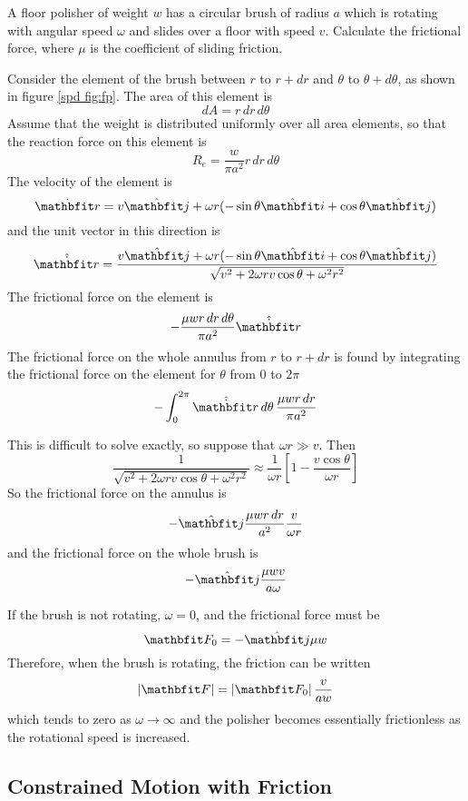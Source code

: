 \begin{example}
\problem
A floor polisher of weight $w$ has a circular brush of radius $a$ which is
rotating with angular speed $\omega$ and slides over a floor with speed $v$. 
Calculate the frictional force, where $\mu$ is the coefficient of sliding
friction.  

\solution
Consider the element of the brush between $r$ to $r+dr$ and $\theta$ to
$\theta+d\theta$, as shown in figure \ref{spd fig:fp}.  The area of this 
element is 
$$dA=r\,dr\,d\theta$$
Assume that the weight is distributed uniformly over all area elements, so
that the reaction force on this element is
$$R_e=\frac{w}{\pi a^2}r\,dr\,d\theta$$
The velocity of the element is
$$\dot{\vect{r}}=v\jvect+\omega r (-\sin\theta\ivect+\cos\theta\jvect)$$
and the unit vector in this direction is
$$\hat{\dot{\vect{r}}}=\frac{v\jvect+\omega r 
(-\sin\theta\ivect+\cos\theta\jvect)}
{\sqrt{v^2+2\omega rv\cos\theta+\omega^2r^2}}$$
The frictional force on the element is
$$-\frac{\mu w r\,dr\,d\theta}{\pi a^2}\hat{\dot{\vect{r}}}$$
The frictional force on the whole annulus from $r$ to $r+dr$ is found by
integrating the frictional force on the element for $\theta$ from $0$ to
$2\pi$
$$-\int_0^{2\pi}\hat{\dot{\vect{r}}}\,d\theta\,\frac{\mu wr\,dr}{\pi a^2}$$

This is difficult to solve exactly, so suppose that $\omega r\gg v$.  Then
$$\frac{1}{\sqrt{v^2+2\omega rv\cos\theta+\omega^2r^2}}\approx
\frac{1}{\omega r}\left[1-\frac{v\cos\theta}{\omega r}\right]$$
So the frictional force on the annulus is
$$-\jvect\frac{\mu wr\,dr}{a^2}\frac{v}{\omega r}$$
and the frictional force on the whole brush is
$$-\jvect\frac{\mu wv}{a\omega}$$

If the brush is not rotating, $\omega=0$, and the frictional force must be
$$\vect{F}_0=-\jvect\mu w$$
Therefore, when the brush is rotating, the friction can be written
$$\left|\vect{F}\right|=\left|\vect{F}_0\right|\frac{v}{aw}$$
which tends to zero as $\omega\to\infty$ and the polisher becomes
essentially frictionless as the rotational speed is increased.
\end{example}

\subsection{Constrained Motion with Friction}

